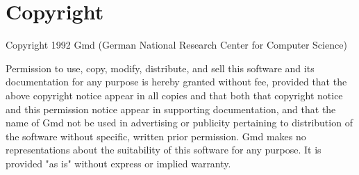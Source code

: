 \newcommand{\defun}[2]{{{\bf #1} #2\hfill[{\it Function}]}}
\newcommand{\defmacro}[2]{{{\bf #1} #2\hfill[{\it Macro}]}}
\newcommand{\syntax}{\normalsize\item[Syntax:]\fnsize}
\newcommand{\beschr}{\normalsize\item[Description:]}
\newcommand{\parameter}{\normalsize\item[Parameters:]}
\newcommand{\beispiel}{\normalsize\item[Example:]\fnsize}
\newcommand{\hinweis}{\normalsize\item[Note:]}
\newcommand{\xmref}[1]{\normalsize\item[Motif function:]\motif{#1}}
\newcommand{\lparam}[1]{\item[\param{#1}]}
\newenvironment{lispd}{\begin{list}{Parameter:}{\renewcommand{\makelabel}[1]{{##1}\hfill}\setlength{\leftmargin}{3cm}\setlength{\labelwidth}{3cm}\setlength{\labelsep}{0mm}}}{\end{list}}
\newenvironment{paramd}{\begin{list}{Parameter:}{\renewcommand{\makelabel}[1]{{##1}\hfill}\setlength{\leftmargin}{3cm}\setlength{\labelwidth}{3cm}\setlength{\labelsep}{0mm}\setlength{\rightmargin}{0.5cm}}}{\end{list}}
\newcommand{\einbild}[4]{\begin{figure}[htbp]\vspace{#2}\hspace{#3}\special{#1}\caption{#4}\end{figure}}


\maketitle

\chapter*{Copyright}

Copyright 1992 {\sc Gmd} (German National Research Center for Computer Science)
\vspace{0.3cm}

Permission to use, copy, modify, distribute, and sell this software and its
documentation for any purpose is hereby granted without fee, provided that the
above copyright notice appear in all copies and that both that copyright notice
and this permission notice appear in supporting documentation, and that the name
of {\sc Gmd} not be used in advertising or publicity pertaining to distribution of the
software without specific, written prior permission.  {\sc Gmd} makes no
representations about the suitability of this software for any purpose.  It is
provided "as is" without express or implied warranty. 
\vspace{0.3cm}

